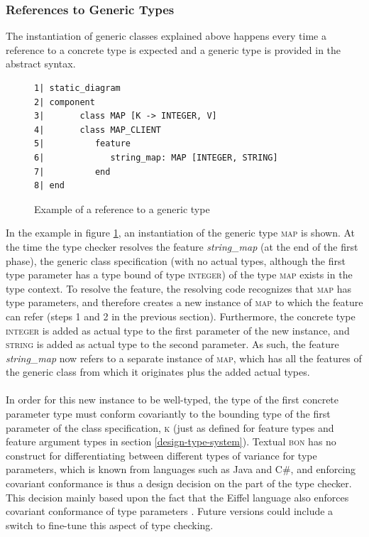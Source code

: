 \subsubsection{References to Generic Types}
The instantiation of generic classes explained above happens every time a reference to a concrete type is expected and a generic type is provided in the abstract syntax.
\begin{figure}[H]
{\footnotesize
\begin{verbatim}
1| static_diagram
2| component
3|       class MAP [K -> INTEGER, V]
4|       class MAP_CLIENT
5|          feature
6|             string_map: MAP [INTEGER, STRING]
7|          end
8| end
\end{verbatim}
}
\caption{Example of a reference to a generic type}
\label{fig:ref_generic_type}
\end{figure}
In the example in figure \ref{fig:ref_generic_type}, an instantiation of the generic type \textsc{map} is shown. At the time the type checker resolves the feature \textit{string\_map} (at the end of the first phase), the generic class specification (with no actual types, although the first type parameter has a type bound of type \textsc{integer}) of the type \textsc{map} exists in the type context. To resolve the feature, the resolving code recognizes that \textsc{map} has type parameters, and therefore creates a new instance of \textsc{map} to which the feature can refer (steps 1 and 2 in the previous section). Furthermore, the concrete type \textsc{integer} is added as actual type to the first parameter of the new instance, and \textsc{string} is added as actual type to the second parameter. As such, the feature  \textit{string\_map} now refers to a separate instance of \textsc{map}, which has all the features of the generic class from which it originates plus the added actual types.
\paragraph{} In order for this new instance to be well-typed, the type of the first concrete parameter type must conform covariantly to the bounding type of the first parameter of the class specification, \textsc{k} (just as defined for feature types and feature argument types in section \ref{design-type-system}). Textual \textsc{bon} has no construct for differentiating between different types of variance for type parameters, which is known from languages such as Java and C\#, and enforcing covariant conformance is thus a design decision on the part of the type checker. This decision mainly based upon the fact that the Eiffel language also enforces covariant conformance of type parameters \cite[Constrained~genericity]{meyer2001}. Future versions could include a switch to fine-tune this aspect of type checking.

